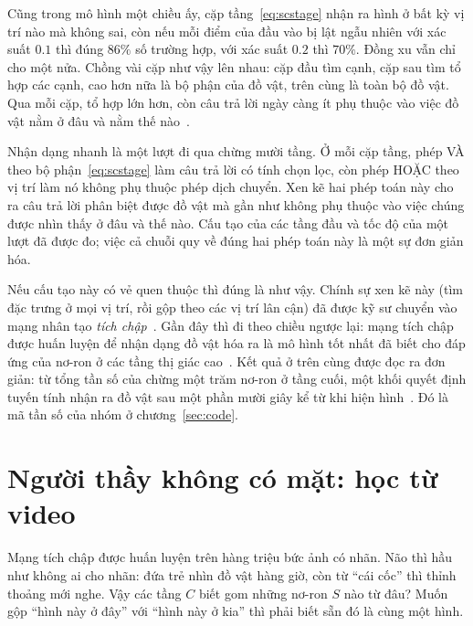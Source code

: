 Cũng trong mô hình một chiều ấy, cặp tầng~\eqref{eq:scstage} nhận ra hình ở bất kỳ vị trí nào mà không sai, còn nếu mỗi điểm của đầu vào bị lật ngẫu nhiên với xác suất $0.1$ thì đúng $86\%$ số trường hợp, với xác suất $0.2$ thì $70\%$. Đồng xu vẫn chỉ cho một nửa. Chồng vài cặp như vậy lên nhau: cặp đầu tìm cạnh, cặp sau tìm tổ hợp các cạnh, cao hơn nữa là bộ phận của đồ vật, trên cùng là toàn bộ đồ vật. Qua mỗi cặp, tổ hợp lớn hơn, còn câu trả lời ngày càng ít phụ thuộc vào việc đồ vật nằm ở đâu và nằm thế nào~\cite{Riesenhuber1999}.

\begin{keyblock}
\begin{proposition}
\label{prop:conveyor}
Nhận dạng nhanh là một lượt đi qua chừng mười tầng. Ở mỗi cặp tầng, phép VÀ theo bộ phận~\eqref{eq:scstage} làm câu trả lời có tính chọn lọc, còn phép HOẶC theo vị trí làm nó không phụ thuộc phép dịch chuyển. Xen kẽ hai phép toán này cho ra câu trả lời phân biệt được đồ vật mà gần như không phụ thuộc vào việc chúng được nhìn thấy ở đâu và thế nào. Cấu tạo của các tầng đầu và tốc độ của một lượt đã được đo; việc cả chuỗi quy về đúng hai phép toán này là một sự đơn giản hóa.
\end{proposition}
\end{keyblock}

Nếu cấu tạo này có vẻ quen thuộc thì đúng là như vậy. Chính sự xen kẽ này (tìm đặc trưng ở mọi vị trí, rồi gộp theo các vị trí lân cận) đã được kỹ sư chuyển vào mạng nhân tạo \emph{tích chập}~\cite{Fukushima1980}. Gần đây thì đi theo chiều ngược lại: mạng tích chập được huấn luyện để nhận dạng đồ vật hóa ra là mô hình tốt nhất đã biết cho đáp ứng của nơ-ron ở các tầng thị giác cao~\cite{Yamins2014}. Kết quả ở trên cùng được đọc ra đơn giản: từ tổng tần số của chừng một trăm nơ-ron ở tầng cuối, một khối quyết định tuyến tính nhận ra đồ vật sau một phần mười giây kể từ khi hiện hình~\cite{Hung2005}. Đó là mã tần số của nhóm ở chương~\ref{sec:code}.

\section{Người thầy không có mặt: học từ video}

Mạng tích chập được huấn luyện trên hàng triệu bức ảnh có nhãn. Não thì hầu như không ai cho nhãn: đứa trẻ nhìn đồ vật hàng giờ, còn từ ``cái cốc'' thì thỉnh thoảng mới nghe. Vậy các tầng $C$ biết gom những nơ-ron $S$ nào từ đâu? Muốn gộp ``hình này ở đây'' với ``hình này ở kia'' thì phải biết sẵn đó là cùng một hình.

